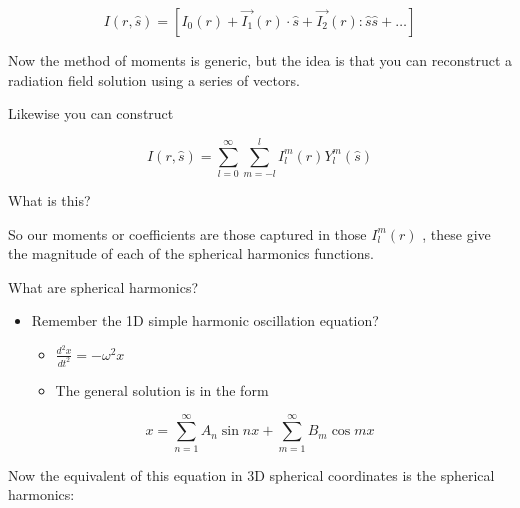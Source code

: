\documentclass[12pt]{article}
\renewcommand{\_}{\kern-1.5pt\textunderscore\kern-1.5pt}
\begin{document}
 \[ I \left( r,\hat{s} \right) = \left[ I_{0} \left( r \right) +\overrightarrow{I_{1}} \left( r \right)  \cdot \hat{s}+\overrightarrow{I_{2}} \left( r \right) :\hat{s}\hat{s}+ \ldots  \right]  \] \par

Now the method of moments is generic, but the idea is that you can reconstruct a radiation field solution using a series of vectors.\par

Likewise you can construct\par

 \[ I \left( r,\hat{s} \right) = \sum _{l=0}^{\infty} \sum _{m=-l}^{l}I_{l}^{m} \left( r \right) Y_{l}^{m} \left( \hat{s} \right)  \] \par

What is this?\par

So our moments or coefficients are those captured in those  \( I_{l}^{m} \left( r \right)  \) , these give the magnitude of each of the spherical harmonics functions.\par

What are spherical harmonics?\par

\begin{itemize}
	\item Remember the 1D simple harmonic oscillation equation?\par

\begin{itemize}
	\item  \( \frac{d^{2}x}{dt^{2}}=- \omega ^{2}x \) \par

	\item The general solution is in the form
\end{itemize}
\end{itemize}\par

\begin{adjustwidth}{0.75in}{0.0in}
 \[ x= \sum _{n=1}^{\infty}A_{n}\sin nx+ \sum _{m=1}^{\infty}B_{m}\cos mx \] \par

\end{adjustwidth}

Now the equivalent of this equation in 3D spherical coordinates is the spherical harmonics:\par
\end{document}
